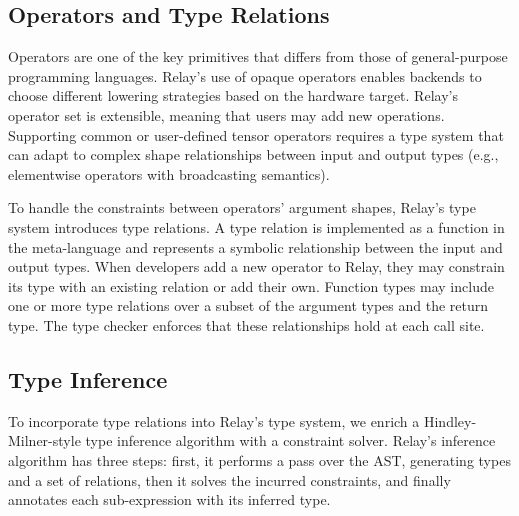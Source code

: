   \subsection*{Operators and Type Relations}
  Operators are one of the key primitives that differs from those of
    general-purpose programming languages.
  Relay's use of opaque operators enables backends to choose different
    lowering strategies based on the hardware target.
  Relay's operator set is extensible, meaning that users may add new operations.
  Supporting common or user-defined tensor operators requires a type system that can
    adapt to complex shape relationships between input and output types
    (e.g., elementwise operators with broadcasting semantics).

  To handle the constraints between operators' argument shapes, Relay's type system
    introduces type relations.
  A type relation is implemented as a function in the
    meta-language and represents a symbolic relationship between
    the input and output types.
  When developers add a new operator to Relay, they may constrain its
    type with an existing relation or add their own.
  Function types may include
    one or more type relations over a subset of the argument types and the return type.
  The type checker enforces that these relationships hold at each call site.

  \subsection*{Type Inference}
  \label{sec:inference}

  To incorporate type relations into Relay's type system, we enrich
    a Hindley-Milner-style type inference algorithm with
    a constraint solver.
  Relay's inference algorithm has three steps: first, it
    performs a pass over the AST, generating types and a set of relations,
    then it solves the incurred constraints,
    and finally annotates each sub-expression with its inferred type.


